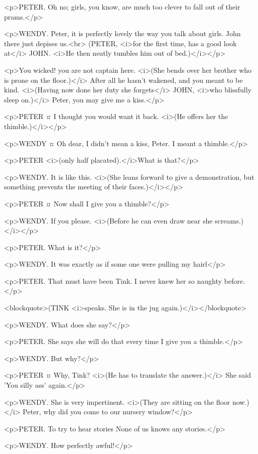 <p>PETER. Oh no; girls, you know, are much too clever to fall out of their prams.</p>

<p>WENDY. Peter, it is perfectly lovely the way you talk about girls. John there just depises us.<br> (PETER, <i>for the first time, has a good look at</i> JOHN. <i>He then neatly tumbles him out of bed.)</i></p>

<p>You wicked! you are not captain here. <i>(She bends over her brother who is prone on the floor.)</i> After all he hasn't wakened, and you meant to be kind. <i>(Having now done her duty she forgets</i> JOHN, <i>who blissfully sleep on.)</i> Peter, you may give me a kiss.</p>

<p>PETER ¤
I thought you would want it back. <i>(He offers her the thimble.)</i></p>

<p>WENDY ¤
Oh dear, I didn't mean a kiss, Peter. I meant a thimble.</p>

<p>PETER <i>(only half placated).</i>What is that?</p>

<p>WENDY. It is like this. <i>(She leans forward to give a demonstration, but something prevents the meeting of their faces.)</i></p>

<p>PETER ¤
Now shall I give you a thimble?</p>

<p>WENDY. If you please. <i>(Before he can even draw near she screams.)</i></p>

<p>PETER. What is it?</p>

<p>WENDY. It was exactly as if some one were pulling my hairl</p>

<p>PETER. That must have been Tink. I never knew her so naughty before.</p>

<blockquote>(TINK <i>speaks. She is in the jug again.)</i></blockquote>

<p>WENDY. What does she say?</p>

<p>PETER. She says she will do that every time I give you a thimble.</p>

<p>WENDY. But why?</p>

<p>PETER ¤
Why, Tink? <i>(He has to translate the answer.)</i> She said 'You silly ass' again.</p>

<p>WENDY. She is very impertinent. <i>(They are sitting on the floor now.)</i> Peter, why did you come to our nursery window?</p>

<p>PETER. To try to hear stories None of us knows any stories.</p>

<p>WENDY. How perfectly awful!</p>

